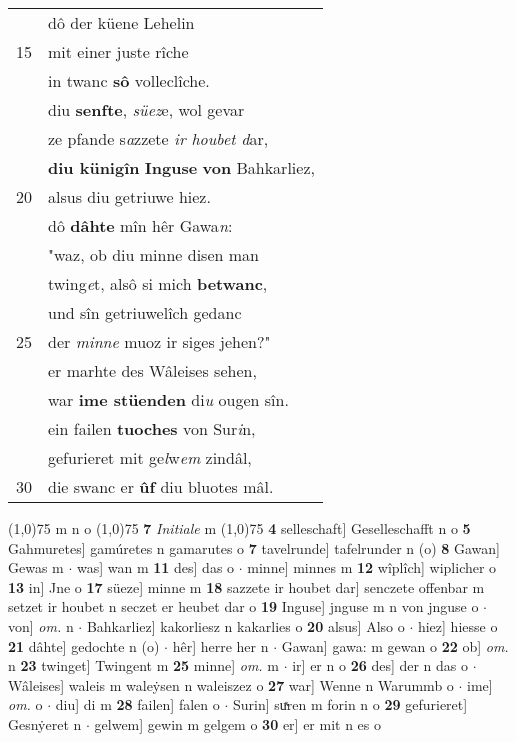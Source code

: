 \documentclass[8pt,a4paper,notitlepage]{article}
\begin{document}
\begin{table}[ht]
\begin{minipage}[t]{0.5\linewidth}
\begin{tabular}{rl}
 & dô der küene Lehelin\\ 
15 & mit einer juste rîche\\ 
 & in twanc \textbf{sô} volleclîche.\\ 
 & diu \textbf{senfte}, \textit{süez}e, wol gevar\\ 
 & ze pfande s\textit{a}zzete \textit{ir houbet d}ar,\\ 
 & \textbf{diu künigîn} \textbf{Inguse} \textbf{von} Bahkarliez,\\ 
20 & alsus diu getriuwe hiez.\\ 
 & dô \textbf{dâhte} mîn hêr Gawa\textit{n}:\\ 
 & "waz, ob diu minne disen man\\ 
 & twing\textit{e}t, alsô si mich \textbf{betwanc},\\ 
 & und sîn getriuwelîch gedanc\\ 
25 & der \textit{minne} muoz ir siges jehen?"\\ 
 & er marhte des Wâleises sehen,\\ 
 & war \textbf{ime stüenden} di\textit{u} ougen sîn.\\ 
 & ein failen \textbf{tuoches} von Sur\textit{i}n,\\ 
 & gefurieret mit ge\textit{l}w\textit{em} zindâl,\\ 
30 & die swanc er \textbf{ûf} diu bluotes mâl.\\ 
\end{tabular}
\scriptsize
\line(1,0){75} \newline
m n o \newline
\line(1,0){75} \newline
\textbf{7} \textit{Initiale} m  \newline
\line(1,0){75} \newline
\textbf{4} selleschaft] Geselleschafft n o \textbf{5} Gahmuretes] gamúretes n gamarutes o \textbf{7} tavelrunde] tafelrunder n (o) \textbf{8} Gawan] Gewas m  $\cdot$ was] wan m \textbf{11} des] das o  $\cdot$ minne] minnes m \textbf{12} wîplîch] wiplicher o \textbf{13} in] Jne o \textbf{17} süeze] minne m \textbf{18} sazzete ir houbet dar] senczete offenbar m setzet ir houbet n seczet er heubet dar o \textbf{19} Inguse] jnguse m n von jnguse o  $\cdot$ von] \textit{om.} n  $\cdot$ Bahkarliez] kakorliesz n kakarlies o \textbf{20} alsus] Also o  $\cdot$ hiez] hiesse o \textbf{21} dâhte] gedochte n (o)  $\cdot$ hêr] herre her n  $\cdot$ Gawan] gawa: m gewan o \textbf{22} ob] \textit{om.} n \textbf{23} twinget] Twingent m \textbf{25} minne] \textit{om.} m  $\cdot$ ir] er n o \textbf{26} des] der n das o  $\cdot$ Wâleises] waleis m waleẏsen n waleiszez o \textbf{27} war] Wenne n Warummb o  $\cdot$ ime] \textit{om.} o  $\cdot$ diu] di m \textbf{28} failen] falen o  $\cdot$ Surin] suͯren m forin n o \textbf{29} gefurieret] Gesnẏeret n  $\cdot$ gelwem] gewin m gelgem o \textbf{30} er] er mit n es o \newline
\end{minipage}
\end{table}
\end{document}
